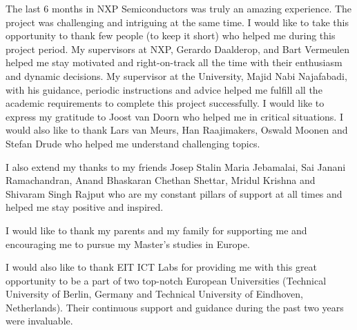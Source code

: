 The last 6 months in NXP Semiconductors was truly an amazing experience. The project was challenging and intriguing at the same time. I would like to take this opportunity to thank few people (to keep it short) who helped me during this project period. My supervisors at NXP, Gerardo Daalderop, and Bart Vermeulen helped me stay motivated and right-on-track all the time with their enthusiasm and dynamic decisions. My supervisor at the University, Majid Nabi Najafabadi, with his guidance, periodic instructions and advice helped me fulfill all the academic requirements to complete this project successfully. I would like to express my gratitude to Joost van Doorn who helped me in critical situations. I would also like to thank Lars van Meurs, Han Raajimakers, Oswald Moonen and Stefan Drude who helped me understand challenging topics. 

I also extend my thanks to my friends Josep Stalin Maria Jebamalai, Sai Janani Ramachandran, Anand Bhaskaran Chethan Shettar, Mridul Krishna and Shivaram Singh Rajput who are my constant pillars of support at all times and helped me stay positive and inspired.

I would like to thank my parents and my family for supporting me and encouraging me to pursue my Master's studies in Europe.  

I would also like to thank EIT ICT Labs for providing me with this great opportunity to be a part of two top-notch European Universities (Technical University of Berlin, Germany and Technical University of Eindhoven, Netherlands). Their continuous support and guidance during the past two years were invaluable.